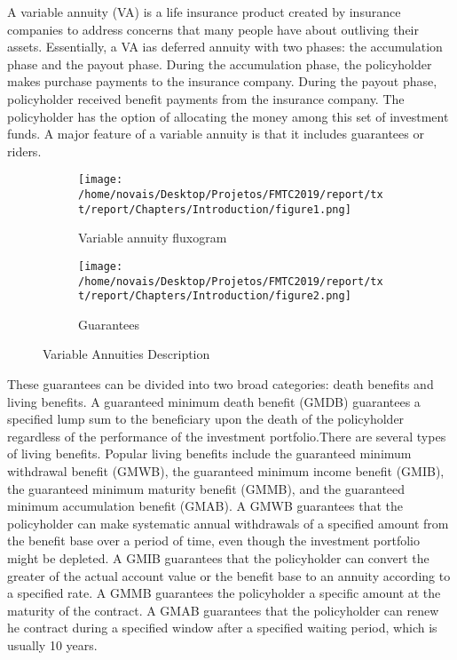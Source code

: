 A variable annuity (VA) is a life insurance product created by insurance companies to address concerns that many people have about outliving their assets. Essentially, a VA ias deferred annuity with two phases: the accumulation phase and the payout phase. During the accumulation phase, the policyholder makes purchase payments to the insurance company. During the payout phase, policyholder received benefit payments from the insurance company. The policyholder has the option of allocating the money among this set of investment funds. A major feature of a variable annuity is that it includes guarantees or riders.

\begin{figure}
  	\begin{subfigure}[b]{0.5\textwidth}
    \texttt{[image: /home/novais/Desktop/Projetos/FMTC2019/report/txt/report/Chapters/Introduction/figure1.png]}
    \caption{Variable annuity fluxogram}
    \label{fig:1}
  	\end{subfigure}
  	\begin{subfigure}[b]{0.5\textwidth}
    \texttt{[image: /home/novais/Desktop/Projetos/FMTC2019/report/txt/report/Chapters/Introduction/figure2.png]}
    \caption{Guarantees}
    \label{fig:2}
  	\end{subfigure}
  	\caption{Variable Annuities Description}
\end{figure}

These guarantees can be divided into two broad categories: death benefits and living benefits. A guaranteed minimum death benefit (GMDB) guarantees a specified lump sum to the beneficiary upon the death of the policyholder regardless of the performance of the investment portfolio.There are several types of living benefits. Popular living benefits include the guaranteed minimum withdrawal benefit (GMWB), the guaranteed minimum income benefit (GMIB), the guaranteed minimum maturity benefit (GMMB), and the guaranteed minimum accumulation benefit (GMAB). A GMWB guarantees that the policyholder can make systematic annual withdrawals of a specified
amount from the benefit base over a period of time, even though the investment portfolio might be depleted. A GMIB guarantees that the policyholder can convert the greater of the actual account value or the benefit base to an annuity according to a specified rate. A GMMB guarantees the policyholder a specific amount at the maturity of the contract. A GMAB guarantees that the policyholder can renew he contract during a specified window after a specified waiting period, which is usually 10 years.

